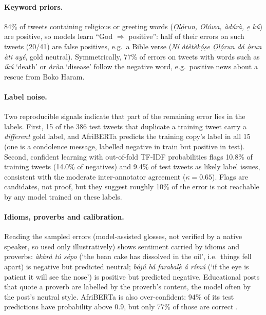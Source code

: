 \documentclass[11pt]{article}
\begin{document}
\paragraph{Keyword priors.} 84\% of tweets containing religious or greeting words (\emph{Ọlọ́run, Olúwa, àdúrà, ẹ kú}) are positive, so models learn ``God $\Rightarrow$ positive'': half of their errors on such tweets (20/41) are false positives, e.g.\ a Bible verse (\emph{Ní àtètèkọ́ṣe Ọlọ́run dá ọ̀run àti ayé}, gold neutral). Symmetrically, 77\% of errors on tweets with words such as \emph{ikú} `death' or \emph{àrùn} `disease' follow the negative word, e.g.\ positive news about a rescue from Boko Haram.

\paragraph{Label noise.} Two reproducible signals indicate that part of the remaining error lies in the labels. First, 15 of the 386 test tweets that duplicate a training tweet carry a \emph{different} gold label, and AfriBERTa predicts the training copy's label in all 15 (one is a condolence message, labelled negative in train but positive in test). Second, confident learning \citep{northcutt-etal-2021-confident} with out-of-fold TF-IDF probabilities flags 10.8\% of training tweets (14.0\% of negatives) and 9.4\% of test tweets as likely label issues, consistent with the moderate inter-annotator agreement ($\kappa=0.65$). Flags are candidates, not proof, but they suggest roughly 10\% of the error is not reachable by any model trained on these labels.

\paragraph{Idioms, proverbs and calibration.} Reading the sampled errors (model-assisted glosses, not verified by a native speaker, so used only illustratively) shows sentiment carried by idioms and proverbs: \emph{àkàrà tú sépo} (`the bean cake has dissolved in the oil', i.e.\ things fell apart) is negative but predicted neutral; \emph{bójú bá farabalẹ̀ á rímú} (`if the eye is patient it will see the nose') is positive but predicted negative. Educational posts that quote a proverb are labelled by the proverb's content, the model often by the post's neutral style. AfriBERTa is also over-confident: 94\% of its test predictions have probability above 0.9, but only 77\% of those are correct \citep{guo-etal-2017-calibration}.
\end{document}
